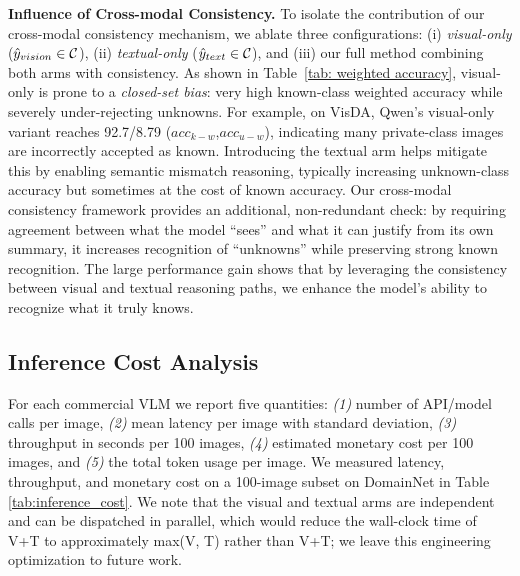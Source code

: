 \documentclass[10pt]{article} %
\begin{document}
\begin{table}[t]
\caption{$H_{u-m}$ scores (\%) for the individual target private classes in the VisDA validation set.}
\label{tab: individual h-score}
\centering
{}
\vspace{-5mm}
\end{table}
\textbf{Influence of Cross-modal Consistency.}
To isolate the contribution of our cross-modal consistency mechanism, we ablate three configurations: (i) \emph{visual-only} ($\hat{y}_{vision} \in {\cal C}$), (ii) \emph{textual-only} ($\hat{y}_{text} \in {\cal C}$), and (iii) our full method combining both arms with consistency.
As shown in Table~\ref{tab: weighted accuracy}, visual-only is prone to a \emph{closed-set bias}: very high known-class weighted accuracy while severely under-rejecting unknowns. For example, on VisDA, Qwen’s visual-only variant reaches 92.7/8.79 ($acc_{k-w}$,$acc_{u-w}$), indicating many private-class images are incorrectly accepted as known.
Introducing the textual arm helps mitigate this by enabling semantic mismatch reasoning, typically increasing unknown-class accuracy but sometimes at the cost of known accuracy. Our cross-modal consistency framework provides an additional, non-redundant check: by requiring agreement between what the model ``sees'' and what it can justify from its own summary, it increases recognition of ``unknowns'' while preserving strong known recognition.
The large performance gain shows that  by leveraging the consistency between visual and textual reasoning paths, we enhance the model’s ability to recognize what it truly knows. 

\subsection{Inference Cost Analysis}
For each commercial VLM we report five quantities: {\em(1)} number of API/model calls per image, {\em(2)} mean latency per image with standard deviation, {\em(3)} throughput in seconds per 100 images, {\em(4)} estimated monetary cost per 100 images, and {\em(5)} the total token usage per image. We measured latency, throughput, and monetary cost on a 100-image subset on DomainNet in Table \ref{tab:inference_cost}. We note that the visual and textual arms are independent and can be dispatched in parallel, which would reduce the wall-clock time of V+T to approximately max(V, T) rather than V+T; we leave this engineering optimization to future work.
\end{document}

